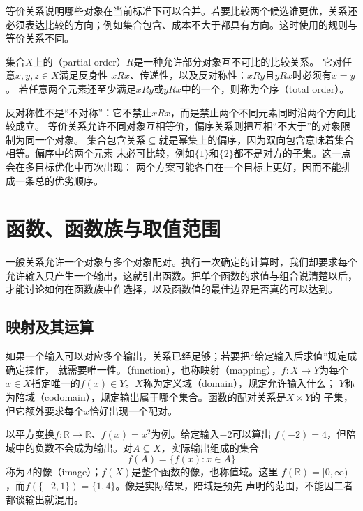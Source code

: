 等价关系说明哪些对象在当前标准下可以合并。若要比较两个候选谁更优，关系还必须表达比较的方向；例如集合包含、成本不大于都具有方向。这时使用的规则与等价关系不同。
\begin{definition}[偏序关系]
\label{def:prelim-partial-order}
集合$X$上的（partial order）$R$是一种允许部分对象互不可比的比较关系。
它对任意$x,y,z\in X$满足反身性
$xRx$、传递性，以及反对称性：$xRy$且$yRx$时必须有$x=y$。
若任意两个元素还至少满足$xRy$或$yRx$中的一个，则称为全序（total order）。
\end{definition}
反对称性不是“不对称”：它不禁止$xRx$，而是禁止两个不同元素同时沿两个方向比较成立。
等价关系允许不同对象互相等价，偏序关系则把互相“不大于”的对象限制为同一个对象。
集合包含关系$\subseteq$就是幂集上的偏序，因为双向包含意味着集合相等。偏序中的两个元素
未必可比较，例如$\{1\}$和$\{2\}$都不是对方的子集。这一点会在多目标优化中再次出现：
两个方案可能各自在一个目标上更好，因而不能排成一条总的优劣顺序。

\section{函数、函数族与取值范围}
\label{sec:prelim-functions-value-ranges}

一般关系允许一个对象与多个对象配对。执行一次确定的计算时，我们却要求每个允许输入只产生一个输出，这就引出函数。把单个函数的求值与组合说清楚以后，才能讨论如何在函数族中作选择，以及函数值的最佳边界是否真的可以达到。

\subsection{映射及其运算}
\label{sec:prelim-map-operations}

如果一个输入可以对应多个输出，关系已经足够；若要把“给定输入后求值”规定成确定操作，
就需要唯一性。（function），也称映射（mapping），$f:X\to Y$为每个
$x\in X$指定唯一的$f(x)\in Y$。$X$称为定义域（domain），规定允许输入什么；
$Y$称为陪域（codomain），规定输出属于哪个集合。函数的配对关系是$X\times Y$的
子集，但它额外要求每个$x$恰好出现一个配对。

以平方变换$f:\mathbb{R}\to\mathbb{R}$、$f(x)=x^2$为例。给定输入$-2$可以算出
$f(-2)=4$，但陪域中的负数不会成为输出。对$A\subseteq X$，实际输出组成的集合
\[
  f(A)=\{f(x):x\in A\}
\]
称为$A$的像（image）；$f(X)$是整个函数的像，也称值域。这里
$f(\mathbb{R})=[0,\infty)$，而$f(\{-2,1\})=\{1,4\}$。像是实际结果，陪域是预先
声明的范围，不能因二者都谈输出就混用。

